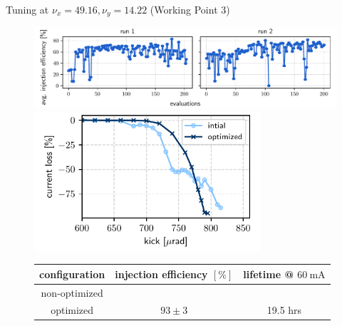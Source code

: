 \documentclass[aspectratio=169]{beamer}
\begin{document}
\begin{frame}{Tuning at $\nu_x = 49.16, \nu_y = 14.22$ (Working Point 3)}
    \begin{minipage}{0.55\textwidth}
        \begin{figure}
            \centering
            \includegraphics[width=\textwidth]{wp3_history.pdf}
            \pause
            \includegraphics[width = 0.75\textwidth]{wp3_kick_resilience.pdf}
            \begin{table}[]
                \scriptsize
                \begin{tabular}{ccc}
                \hline
                configuration & injection efficiency $[\%]$  & lifetime @ $\unit{60~\milli\ampere}$  \\ \hline
                non-optimized        &                       &          \\
                optimized            & $93\pm3$              &    19.5 hrs   \\ \hline
                \end{tabular}
                \end{table}
        \end{figure}
    \end{minipage}
    \hfill
    \begin{minipage}{0.44\textwidth}
        \begin{figure}
            \centering

\end{figure}
\end{minipage}
\end{frame}
\end{document}
